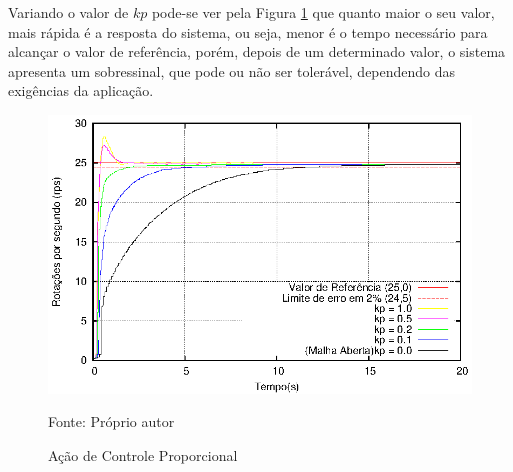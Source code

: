 Variando o valor de $kp$ pode-se ver pela Figura \ref{fig:AnexoAacaoP} que quanto maior o seu valor, mais rápida é a resposta do sistema, ou seja, menor é o tempo necessário para alcançar o valor de referência, porém, depois de um determinado valor, o sistema apresenta um sobressinal, que pode ou não ser tolerável, dependendo das exigências da aplicação.

\begin{figure}[!htb]
\centering
\caption{Ação de Controle Proporcional}
\center\includegraphics[scale=1.4]{./imagens/acaoP.eps}
\label{fig:AnexoAacaoP}

{\small Fonte: Próprio autor}
\end{figure}



